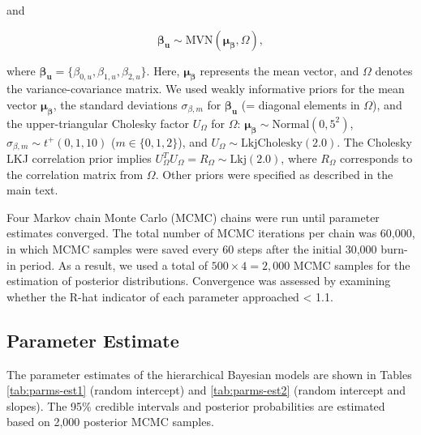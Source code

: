 \documentclass[11pt, class=article, crop=false]{standalone}
\theoremstyle{definition}
\begin{document}
and

\begin{equation}
    \boldsymbol{\beta_u} \sim \mathrm{MVN}(\boldsymbol{\mu_{\beta}}, \Omega),
\end{equation}

where $\boldsymbol{\beta_u} = \{\beta_{0, u}, \beta_{1, u}, \beta_{2, u}\}$. Here, $\boldsymbol{\mu_{\beta}}$ represents the mean vector, and $\Omega$ denotes the variance-covariance matrix.
We used weakly informative priors for the mean vector $\boldsymbol{\mu_{\beta}}$, the standard deviations $\sigma_{\beta, m}$ for $\boldsymbol{\beta_u}$ (= diagonal elements in $\Omega$), and the upper-triangular Cholesky factor $U_{\Omega}$ for $\Omega$:  $\boldsymbol{\mu_{\beta}} \sim \mathrm{Normal}(0, 5^2)$, $\sigma_{\beta, m} \sim t^+(0, 1, 10)$ ($m \in \{0, 1, 2\}$), and $U_{\Omega} \sim \mathrm{LkjCholesky}(2.0)$.
The Cholesky LKJ correlation prior implies $U_{\Omega}^T U_{\Omega} = R_{\Omega} \sim \mathrm{Lkj}(2.0)$, where $R_{\Omega}$ corresponds to the correlation matrix from $\Omega$. 
Other priors were specified as described in the main text.

Four Markov chain Monte Carlo (MCMC) chains were run until parameter estimates
converged.
The total number of MCMC iterations per chain was 60,000, in which MCMC samples were saved every 60 steps after the initial 30,000 burn-in period.
As a result, we used a total of $500 \times 4 = 2,000$ MCMC samples for the estimation of posterior distributions.
Convergence was assessed by examining whether the R-hat indicator of each parameter approached < 1.1.

\subsection{Parameter Estimate}

The parameter estimates of the hierarchical Bayesian models are shown in Tables \ref{tab:parms-est1} (random intercept) and \ref{tab:parms-est2} (random intercept and slopes).
The 95\% credible intervals and posterior probabilities are estimated based on 2,000 posterior MCMC samples.

\vspace{0.5cm} 

\vspace{0.5cm} 

\vspace{0.5cm} 

\vspace{0.5cm} 

\newpage


\end{document}
